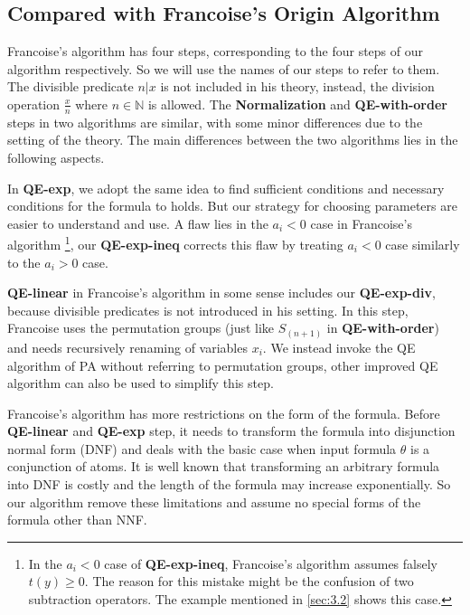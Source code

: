 \subsection{Compared with Francoise's Origin Algorithm}

Francoise's algorithm \cite{Francoise} has four steps,
corresponding to the four steps of our algorithm respectively.
So we will use the names of our steps to refer to them. 
The divisible predicate $n|x$ is not included in his theory,
instead, the division operation $\frac{x}{n}$ where $n\in \mathbb{N}$ is allowed.
The \textbf{Normalization} and \textbf{QE-with-order} steps in two algorithms are similar,
with some minor differences due to the setting of the theory.
The main differences between the two algorithms lies in the following aspects.

In \textbf{QE-exp},
we adopt the same idea to find sufficient conditions
and necessary conditions for the formula to holds.
But our strategy for choosing parameters are easier to understand and use.
A flaw lies in the $a_i<0$ case in Francoise's algorithm 
\footnote{
In the $a_i<0$ case of \textbf{QE-exp-ineq},
Francoise's algorithm assumes falsely $t(y)\ge 0$.
The reason for this mistake might be the confusion of 
two subtraction operators.
The example mentioned in \ref{sec:3.2} shows this case.
},
our \textbf{QE-exp-ineq} corrects this flaw by 
treating $a_i<0$ case similarly to the $a_i>0$ case.

\textbf{QE-linear} in Francoise's algorithm in some sense includes our
\textbf{QE-exp-div}, because divisible predicates is not introduced in his setting.
In this step,
Francoise uses the permutation groups (just like $S_{(n+1)}$ in \textbf{QE-with-order}) and needs recursively renaming of variables $x_i$.
We instead invoke the QE algorithm of PA without referring to permutation groups, 
other improved QE algorithm can also be used to simplify this step.

Francoise's algorithm has more restrictions on the form
of the formula.
Before \textbf{QE-linear} and \textbf{QE-exp} step,
it needs to transform the formula into disjunction normal form (DNF)
and deals with the basic case when input formula $\theta$ is 
a conjunction of atoms. 
It is well known that transforming an arbitrary formula into 
DNF is costly and the length of the formula may increase exponentially.
So our algorithm remove these limitations and assume no special forms of
the formula other than NNF.




